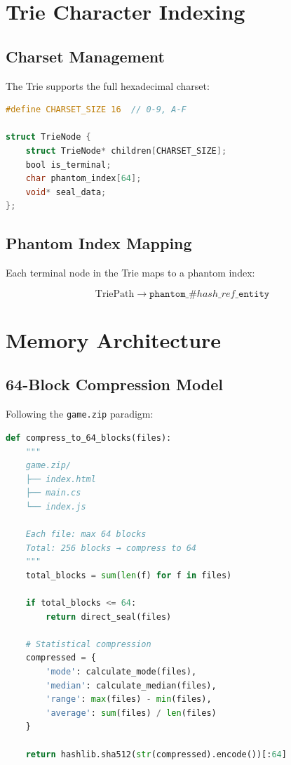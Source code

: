 \documentclass[12pt,a4paper]{report}
\theoremstyle{definition}
\newcommand{\phantomindex}[1]{\texttt{phantom\_\#}#1\texttt{\_entity}}
\begin{document}
\section{Trie Character Indexing}

\subsection{Charset Management}

The Trie supports the full hexadecimal charset:

\begin{lstlisting}[language=C, caption=Trie Node Structure]
#define CHARSET_SIZE 16  // 0-9, A-F

struct TrieNode {
    struct TrieNode* children[CHARSET_SIZE];
    bool is_terminal;
    char phantom_index[64];
    void* seal_data;
};
\end{lstlisting}

\subsection{Phantom Index Mapping}

Each terminal node in the Trie maps to a phantom index:

\begin{equation}
\text{TriePath} \rightarrow \phantomindex{hash\_ref}
\end{equation}

\section{Memory Architecture}

\subsection{64-Block Compression Model}

Following the \texttt{game.zip} paradigm:

\begin{lstlisting}[language=Python, caption=64-Block Compression]
def compress_to_64_blocks(files):
    """
    game.zip/
    ├── index.html
    ├── main.cs
    └── index.js
    
    Each file: max 64 blocks
    Total: 256 blocks → compress to 64
    """
    total_blocks = sum(len(f) for f in files)
    
    if total_blocks <= 64:
        return direct_seal(files)
    
    # Statistical compression
    compressed = {
        'mode': calculate_mode(files),
        'median': calculate_median(files),
        'range': max(files) - min(files),
        'average': sum(files) / len(files)
    }
    
    return hashlib.sha512(str(compressed).encode())[:64]
\end{lstlisting}
\end{document}
